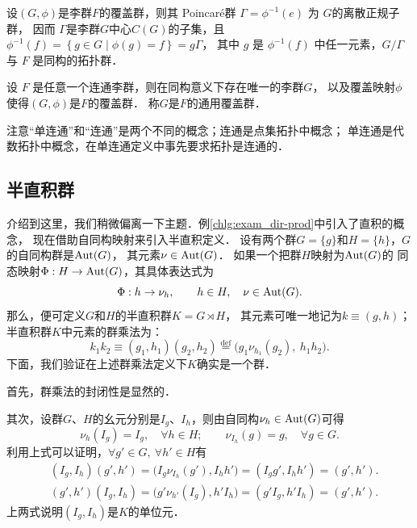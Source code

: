 \begin{theorem}
    设$(G, \phi)$是李群$F$的覆盖群，则其 Poincar\'e群 $\Gamma=\phi^{-1}(e)$ 为 $G$的{\heiti 离散正规子群}，
    因而 $\Gamma$是李群$G$中心$C (G)$的子集，且 $\phi^{-1}(f)=\left\{g \in G \mid \phi(g)=f\right\}=g \Gamma$，
    其中 $g$ 是 $\phi^{-1}(f)$ 中任一元素，$G / \Gamma$ 与 $F$ 是同构的拓扑群．
\end{theorem}

\begin{theorem}
    设 $F$ 是任意一个连通李群，则在同构意义下存在唯一的李群$G$，
    以及覆盖映射$\phi$使得$(G,\phi)$是$F$的覆盖群．    
    称$G$是$F$的{\heiti 通用覆盖群}．
\end{theorem}


注意“单连通”和“连通”是两个不同的概念；连通是点集拓扑中概念；
单连通是代数拓扑中概念，在单连通定义中事先要求拓扑是连通的．



\subsection{半直积群}\label{chlg:sec_semi-dir-prod}
介绍到这里，我们稍微偏离一下主题．例\ref{chlg:exam_dir-prod}中引入了{\kaishu 直积}的概念，
现在借助自同构映射来引入{\kaishu 半直积}定义．
设有两个群$G=\{g\}$和$H=\{h\}$，$G$的自同构群是${\rm Aut}(G)$，
其元素$\nu \in {\rm Aut}(G)$．
如果一个把群$H$映射为${\rm Aut}(G)$的
同态映射$\Phi:H\to {\rm Aut}(G)$，其具体表达式为
\begin{equation}
    \Phi : h \to \nu_h ,\qquad h\in H,\quad \nu \in {\rm Aut}(G).
\end{equation}
那么，便可定义$G$和$H$的{\heiti 半直积群}$K=G  \rtimes H$，
其元素可唯一地记为$k\equiv (g,h)$； %
半直积群$K$中元素的群乘法为：
\begin{equation}\label{chlg:eqn_semi-dir-prod}
    k_1 k_2 \equiv (g_1, h_1) (g_2, h_2)
    \overset{\mathrm {def}}{=} \bigl(g_1 \nu_{h_1}(g_2),\ h_1 h_2 \bigr) .
\end{equation}
下面，我们验证在上述群乘法定义下$K$确实是一个群．

首先，群乘法的封闭性是显然的．

其次，设群$G$、$H$的幺元分别是$I_g$、$I_h$，则由自同构$\nu_h\in {\rm Aut}(G)$可得
\begin{equation}
    \nu_h (I_g)   =I_g, \quad  \forall h\in H ; \qquad
    \nu_{I_h} (g) = g,  \quad  \forall g\in G .
\end{equation}
利用上式可以证明，$\forall g'\in G,\ \forall h'\in H$有
\begin{align}
    &( I_g, I_h ) (g', h') = \bigl( I_g \nu_{I_h}(g'), I_h h' \bigr)
    = ( I_g g', I_h h') =( g' ,h'). \\
    & ( g' ,h' )( I_g, I_h ) = \bigl(g'  \nu_{h'}( I_g), h' I_h \bigr)
    =(g' I_g,  h' I_h) =( g', h').
\end{align}
上两式说明$( I_g, I_h) $是$K$的{\kaishu 单位元}．

